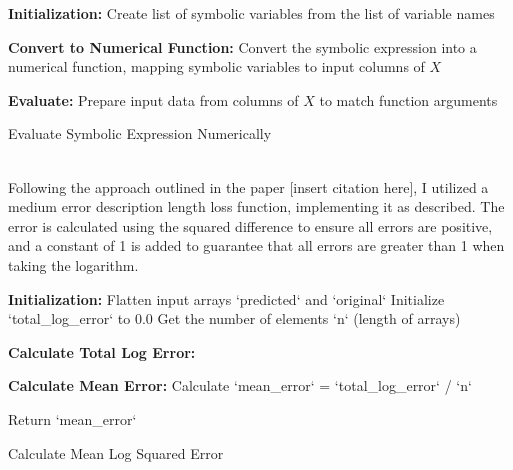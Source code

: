\documentclass{article}
\begin{document}
\begin{algorithm}[H]
\SetAlgoLined
{}

\textbf{Initialization:}\;
Create list of symbolic variables from the list of variable names\;

\textbf{Convert to Numerical Function:}\;
Convert the symbolic expression into a numerical function, mapping symbolic variables to input columns of \(X\)\;

\textbf{Evaluate:}\;
Prepare input data from columns of \(X\) to match function arguments\;

\caption{Evaluate Symbolic Expression Numerically}
\label{alg:evaluate_expression} %
\end{algorithm}\\





Following the approach outlined in the paper [insert citation here], I utilized a medium error description length loss function, implementing it as described. The error is calculated using the squared difference to ensure all errors are positive, and a constant of 1 is added to guarantee that all errors are greater than 1 when taking the logarithm.\\




\begin{algorithm}[H]
\SetAlgoLined
{}

\textbf{Initialization:}\;
Flatten input arrays `predicted` and `original`\;
Initialize `total_log_error` to 0.0\;
Get the number of elements `n` (length of arrays)\;

\textbf{Calculate Total Log Error:}\;

\textbf{Calculate Mean Error:}\;
Calculate `mean_error` = `total_log_error` / `n`\;

Return `mean_error`\;

\caption{Calculate Mean Log Squared Error}
\label{alg:mean_log_squared_error} %
\end{algorithm}\\
\end{document}
